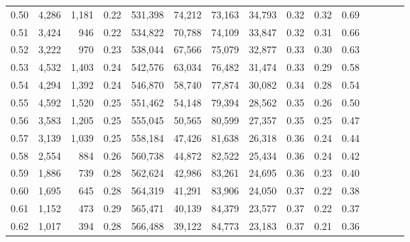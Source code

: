 \begin{tabular}{rrrcrrrrrrrrrrr}
0.50 &   4,286 &  1,181 &                                       0.22 &  531,398 &   74,212 &   73,163 &   34,793 &  0.32 &  0.32 &                         0.69 \\
0.51 &   3,424 &    946 &                                       0.22 &  534,822 &   70,788 &   74,109 &   33,847 &  0.32 &  0.31 &                         0.66 \\
0.52 &   3,222 &    970 &                                       0.23 &  538,044 &   67,566 &   75,079 &   32,877 &  0.33 &  0.30 &                         0.63 \\
0.53 &   4,532 &  1,403 &                                       0.24 &  542,576 &   63,034 &   76,482 &   31,474 &  0.33 &  0.29 &                         0.58 \\
0.54 &   4,294 &  1,392 &                                       0.24 &  546,870 &   58,740 &   77,874 &   30,082 &  0.34 &  0.28 &                         0.54 \\
0.55 &   4,592 &  1,520 &                                       0.25 &  551,462 &   54,148 &   79,394 &   28,562 &  0.35 &  0.26 &                         0.50 \\
0.56 &   3,583 &  1,205 &                                       0.25 &  555,045 &   50,565 &   80,599 &   27,357 &  0.35 &  0.25 &                         0.47 \\
0.57 &   3,139 &  1,039 &                                       0.25 &  558,184 &   47,426 &   81,638 &   26,318 &  0.36 &  0.24 &                         0.44 \\
0.58 &   2,554 &    884 &                                       0.26 &  560,738 &   44,872 &   82,522 &   25,434 &  0.36 &  0.24 &                         0.42 \\
0.59 &   1,886 &    739 &                                       0.28 &  562,624 &   42,986 &   83,261 &   24,695 &  0.36 &  0.23 &                         0.40 \\
0.60 &   1,695 &    645 &                                       0.28 &  564,319 &   41,291 &   83,906 &   24,050 &  0.37 &  0.22 &                         0.38 \\
0.61 &   1,152 &    473 &                                       0.29 &  565,471 &   40,139 &   84,379 &   23,577 &  0.37 &  0.22 &                         0.37 \\
0.62 &   1,017 &    394 &                                       0.28 &  566,488 &   39,122 &   84,773 &   23,183 &  0.37 &  0.21 &                         0.36 \\

\end{tabular}
